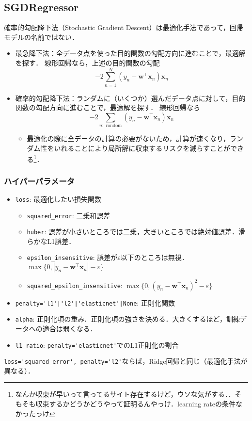 \documentclass[a4paper,lualatex,ja=standard,oneside,fleqn]{bxjsarticle}
\begin{document}
\subsection{SGDRegressor}
確率的勾配降下法（Stochastic Gradient Descent）は最適化手法であって，回帰モデルの名前ではない．
\begin{itemize}
  \item 最急降下法：全データ点を使った目的関数の勾配方向に進むことで，最適解を探す．
  線形回帰なら，上述の目的関数の勾配
  \begin{equation*}
    -2\sum_{n=1}^N(y_n-\bm{w}^\top\bm{x}_n)\bm{x}_n
  \end{equation*}
  \item 確率的勾配降下法：ランダムに（いくつか）選んだデータ点に対して，目的関数の勾配方向に進むことで，最適解を探す．
  線形回帰なら
  \begin{equation*}
    -2\sum_{n:\text{ rondom}}(y_n-\bm{w}^\top\bm{x}_n)\bm{x}_n
  \end{equation*}
  \begin{itemize}
    \item 最適化の際に全データの計算の必要がないため，計算が速くなり，ランダム性をいれることにより局所解に収束するリスクを減らすことができる\footnote{なんか収束が早いって言ってるサイト存在するけど，ウソな気がする．．そもそも収束するかどうかどうやって証明るんやっけ．learning rateの条件なかったっけ}．
  \end{itemize}
\end{itemize}
\subsubsection*{ハイパーパラメータ}
\begin{itemize}
  \item \verb|loss|: 最適化したい損失関数
  \begin{itemize}
    \item \verb|squared_error|: 二乗和誤差
    \item \verb|huber|: 誤差が小さいところでは二乗，大きいところでは絶対値誤差．滑らかなL1誤差．
    \item \verb|epsilon_insensitive|: 誤差が$\varepsilon$以下のところは無視．$\max\{0,|y_n-\bm{w}^\top\bm{x}_n|-\varepsilon\}$
    \item \verb|squared_epsilon_insensitive|: $\max\{0,(y_n-\bm{w}^\top\bm{x}_n)^2-\varepsilon\}$
  \end{itemize}
  \item \verb+penalty='l1'|'l2'|'elasticnet'|None+: 正則化関数
  \item \verb|alpha|: 正則化項の重み．正則化項の強さを決める．大きくするほど，訓練データへの適合は弱くなる．
  \item \verb|l1_ratio|: \verb|penalty='elasticnet'|でのL1正則化の割合
\end{itemize}
\verb|loss='squared_error', penalty='l2'|ならば，Ridge回帰と同じ（最適化手法が異なる）．
\end{document}
